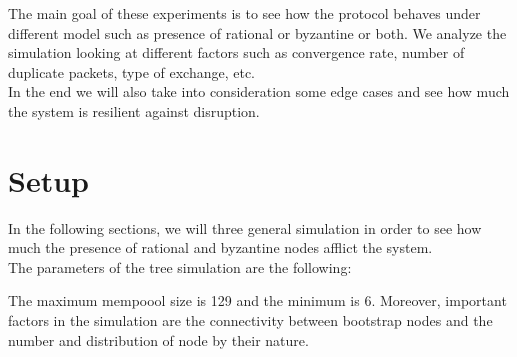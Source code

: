 \documentclass[mscthesis]{usiinfthesis}
\begin{document}
The main goal of these experiments is to see how the protocol behaves under different model such as presence of rational or byzantine or both. We analyze the simulation looking at different factors such as convergence rate, number of duplicate packets, type of exchange, etc. \\
In the end we will also take into consideration some edge cases and see how much the system is resilient against disruption.

\section{Setup}
In the following sections, we will three general simulation in order to see how much the presence of rational and byzantine nodes afflict the system. \\
The parameters of the tree simulation are the following:

\begin{table}[H]
\centering
{}
\caption{Simulation parameters}
\label{tab:simulation-parameters-two}
\end{table}

The maximum mempoool size is 129 and the minimum is 6.
Moreover, important factors in the simulation are the connectivity between bootstrap nodes and the number and distribution of node by their nature.
\end{document}
